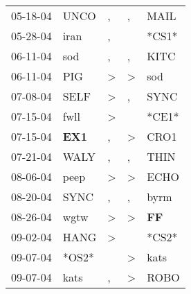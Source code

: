 \begin{supertabular}{p{0.07\textwidth}p{0.06\textwidth}p{0.02\textwidth}p{0.02\textwidth}p{0.06\textwidth}}
          05-18-04\textsuperscript{} &           UNCO\textsuperscript{} &                , &                , &           MAIL\textsuperscript{} \\
          05-28-04\textsuperscript{} &           iran\textsuperscript{} &                , &                  &                            *CS1* \\
          06-11-04\textsuperscript{} &            sod\textsuperscript{} &                , &                , &           KITC\textsuperscript{} \\
          06-11-04\textsuperscript{} &            PIG\textsuperscript{} &     \textgreater &     \textgreater &            sod\textsuperscript{} \\
          07-08-04\textsuperscript{} &           SELF\textsuperscript{} &     \textgreater &                , &           SYNC\textsuperscript{} \\
          07-15-04\textsuperscript{} &           fwll\textsuperscript{} &     \textgreater &                  &                            *CE1* \\
          07-15-04\textsuperscript{} &   \textbf{EX1\textsuperscript{}} &                , &     \textgreater &           CRO1\textsuperscript{} \\
          07-21-04\textsuperscript{} &           WALY\textsuperscript{} &                , &                , &           THIN\textsuperscript{} \\
          08-06-04\textsuperscript{} &           peep\textsuperscript{} &     \textgreater &     \textgreater &           ECHO\textsuperscript{} \\
          08-20-04\textsuperscript{} &           SYNC\textsuperscript{} &                , &                , &           byrm\textsuperscript{} \\
          08-26-04\textsuperscript{} &           wgtw\textsuperscript{} &     \textgreater &     \textgreater &    \textbf{FF\textsuperscript{}} \\
          09-02-04\textsuperscript{} &           HANG\textsuperscript{} &     \textgreater &                  &                            *CS2* \\
          09-07-04\textsuperscript{} &                            *OS2* &                  &     \textgreater &           kats\textsuperscript{} \\
          09-07-04\textsuperscript{} &           kats\textsuperscript{} &                , &     \textgreater &           ROBO\textsuperscript{} \\

\end{supertabular}
